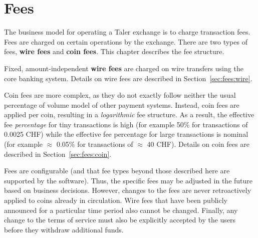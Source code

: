 \documentclass[10pt,a4paper,oneside]{book}
\begin{document}

%



\chapter{Fees} \label{chap:fees}

The business model for operating a Taler exchange is to charge transaction
fees.  Fees are charged on certain operations by the exchange.  There are two
types of fees, {\bf wire fees} and {\bf coin fees}.  This chapter describes
the fee structure.

Fixed, amount-independent {\bf wire fees} are charged on wire transfers using
the core banking system.  Details on wire fees are described in
Section~\ref{sec:fees:wire}.

Coin fees are more complex, as they do not exactly follow neither the usual
percentage of volume model of other payment systems.  Instead, coin fees are
applied per coin, resulting in a {\em logarithmic} fee structure.  As a
result, the effective fee {\em percentage} for tiny transactions is high (for
example 50\% for transactions of 0.0025 CHF) while the effective fee
percentage for large transactions is nominal (for example $\approx$ 0.05\% for
transactions of $\approx$ 40 CHF). Details on coin fees are described in
Section~\ref{sec:fees:coin}.

Fees are configurable (and that fee types beyond those described here are
supported by the software). Thus, the specific fees may be adjusted in the
future based on business decisions.  However, changes to the fees are never
retroactively applied to coins already in circulation.  Wire fees that have
been publicly announced for a particular time period also cannot be changed.
Finally, any change to the terms of service must also be explicitly accepted
by the users before they withdraw additional funds.




%
\end{document}
